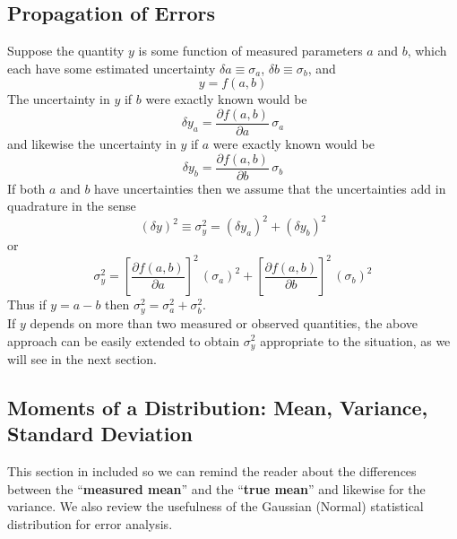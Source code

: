 \documentclass[12pt]{article}
\begin{document}
\subsection{Propagation of Errors}
Suppose the quantity $y$ is some function of measured parameters $a$ and $b$, which each have
   some estimated uncertainty $\delta a \equiv \sigma_a$, $\delta b \equiv \sigma_b$, and
\begin{equation}
  y = f(a,b)
\end{equation}   
The uncertainty in $y$ if $b$ were exactly known would be
\begin{equation}
  \delta y_a = \frac{\partial f(a,b)}{\partial a}\,\sigma_a
\end{equation}
  and likewise the uncertainty in $y$ if $a$ were exactly known would be
\begin{equation}
  \delta y_b = \frac{\partial f(a,b)}{\partial b}\,\sigma_b
\end{equation}  
If both $a$ and $b$ have uncertainties then we assume that the uncertainties add in quadrature
  in the sense
\begin{equation}
  ( \delta y)^2 \equiv \sigma_y^2 =  ( \delta y_a)^2  +  ( \delta y_b)^2
\end{equation}  
  or
\begin{equation}   \label{eq:pe1}
  \sigma_y^2 =  \left[ \frac{\partial f(a,b)}{\partial a}\right]^2 \,   ( \sigma_a)^2  + 
              \left[ \frac{\partial f(a,b)}{\partial b}\right]^2 \,  ( \sigma_b)^2
\end{equation}  
Thus if $y = a - b$ then $\sigma_y^2 = \sigma_a^2 +  \sigma_b^2$.\\

\noindent If $y$ depends on more than two measured or observed quantities, the above approach
  can be easily extended to obtain $\sigma_y^2$ appropriate to the situation, as we will see in the
   next section.
\subsection{Moments of a Distribution: Mean, Variance, Standard Deviation}
This section in included so we can remind the reader about the differences between the ``\textbf{measured mean}''
   and the ``\textbf{true mean}'' and likewise for the variance.
We also review the usefulness of the Gaussian (Normal) statistical distribution for error
  analysis.\\
  
\end{document}

